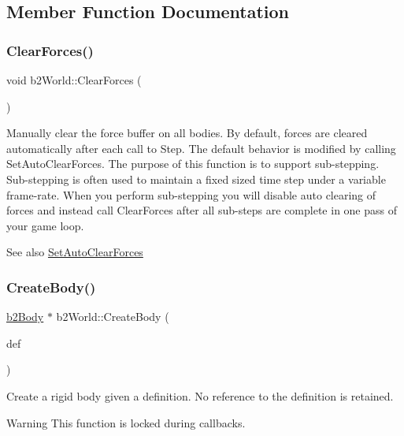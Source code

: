 \subsection{Member Function Documentation}
\mbox{\label{classb2_world_ac082ab4c4ad0b1c5ec4674315eeec643}} 
\subsubsection{\texorpdfstring{Clear\+Forces()}{ClearForces()}}
{\footnotesize\ttfamily void b2\+World\+::\+Clear\+Forces (\begin{DoxyParamCaption}{ }\end{DoxyParamCaption})}

Manually clear the force buffer on all bodies. By default, forces are cleared automatically after each call to Step. The default behavior is modified by calling Set\+Auto\+Clear\+Forces. The purpose of this function is to support sub-\/stepping. Sub-\/stepping is often used to maintain a fixed sized time step under a variable frame-\/rate. When you perform sub-\/stepping you will disable auto clearing of forces and instead call Clear\+Forces after all sub-\/steps are complete in one pass of your game loop. \begin{DoxySeeAlso}{See also}
\hyperlink{classb2_world_aa2bced28ddef5bbb00ed5666e5e9f620}{Set\+Auto\+Clear\+Forces} 
\end{DoxySeeAlso}
\mbox{\label{classb2_world_a2eb36e967e43294bfa03ec3d177c2dae}} 
\subsubsection{\texorpdfstring{Create\+Body()}{CreateBody()}}
{\footnotesize\ttfamily \hyperlink{classb2_body}{b2\+Body} $\ast$ b2\+World\+::\+Create\+Body (\begin{DoxyParamCaption}\item[{const \hyperlink{structb2_body_def}{b2\+Body\+Def} $\ast$}]{def }\end{DoxyParamCaption})}

Create a rigid body given a definition. No reference to the definition is retained. \begin{DoxyWarning}{Warning}
This function is locked during callbacks. 
\end{DoxyWarning}
\mbox{\label{classb2_world_a5cba9d0653149eb62504154e6fb35021}} 
